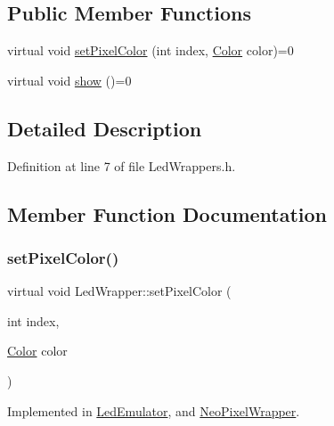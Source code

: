 \subsection*{Public Member Functions}
\begin{DoxyCompactItemize}
\item 
virtual void \hyperlink{class_led_wrapper_ac20a5afaaaaa2c275d7f6008ace09c41}{set\+Pixel\+Color} (int index, \hyperlink{struct_color}{Color} color)=0
\item 
virtual void \hyperlink{class_led_wrapper_a82048b562a501a0a46e5953d2cdb2549}{show} ()=0
\end{DoxyCompactItemize}


\subsection{Detailed Description}


Definition at line 7 of file Led\+Wrappers.\+h.



\subsection{Member Function Documentation}
\mbox{\label{class_led_wrapper_ac20a5afaaaaa2c275d7f6008ace09c41}} 
\subsubsection{\texorpdfstring{set\+Pixel\+Color()}{setPixelColor()}}
{\footnotesize\ttfamily virtual void Led\+Wrapper\+::set\+Pixel\+Color (\begin{DoxyParamCaption}\item[{int}]{index,  }\item[{\hyperlink{struct_color}{Color}}]{color }\end{DoxyParamCaption})\hspace{0.3cm}{\ttfamily [pure virtual]}}



Implemented in \hyperlink{class_led_emulator_a13ce7b61ea614d4d48f3a87c582b6148}{Led\+Emulator}, and \hyperlink{class_neo_pixel_wrapper_a2dc988a9c17e27f36f83acb63e875c10}{Neo\+Pixel\+Wrapper}.

